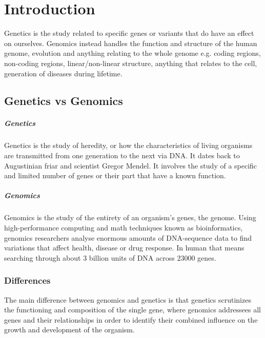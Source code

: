 \graphicspath{{chapters/01/}}
\chapter{Introduction}
Genetics is the study related to specific genes or variants that do have an effect on ourselves.
Genomics instead handles the function and structure of the human genome, evolution and anything relating to the whole genome e.g. coding regions, non-coding regions, linear/non-linear structure, anything that relates to the cell, generation of diseases during lifetime.


\section{Genetics vs Genomics}

	\paragraph*{Genetics}
	Genetics is the study of heredity, or how the characteristics of living organisms are transmitted from one generation to the next via DNA.
	It dates back to Augustinian friar and scientist Gregor Mendel.
	It involves the study of a specific and limited number of genes or their part that have a known function.

	\paragraph*{Genomics}
	Genomics is the study of the entirety of an organism's genes, the genome.
	Using high-performance computing and math techniques known as bioinformatics, genomics researchers analyse enormous amounts of DNA-sequence data to find variations that affect health, disease or drug response.
	In human that means searching through about $3$ billion units of DNA across $23000$ genes.

	\subsection{Differences}
	The main difference between genomics and genetics is that genetics scrutinizes the functioning and composition of the single gene, where genomics addressees all genes and their relationships in order to identify their combined influence on the growth and development of the organism.

